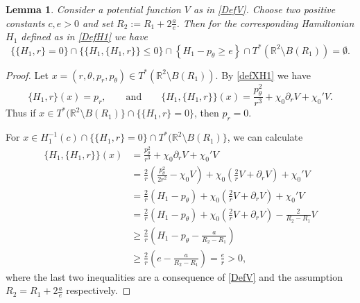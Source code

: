 \documentclass[a4paper]{amsart}
\newtheorem{lem}[thm]{Lemma}%
\numberwithin{equation}{section}
\newcommand{\R}{\mathbb{R}}
\begin{document}
\begin{lem}\label{lem:emptySet}
Consider a potential function $V$ as in \eqref{DefV}. Choose two positive constants $c,e>0$ and set $R_2:=R_1+2\frac{a}{e}$. Then for the corresponding Hamiltonian $H_1$ defined as in \eqref{DefH1} we have
$$
\{\{H_1,r\}=0\}\cap \{\{H_1,\{H_1,r\}\}\leq 0\}\cap \left\lbrace H_1-p_\theta \geq e\right\rbrace\cap T^*(\R^2\setminus B(R_1))=\emptyset.
$$
\end{lem}
\begin{proof}
Let $x=(r,\theta, p_r, p_\theta) \in T^*(\R^2\setminus B(R_1))$. By \eqref{defXH1} we have
$$
\{H_1,r\}(x) = p_r, \qquad \textrm{and}\qquad \{H_1, \{H_1, r\}\}(x)=\frac{p_\theta^2}{r^3}+\chi_0\partial_rV+\chi_0' V.
$$
Thus if $x \in T^*(\R^2\setminus B(R_1)\}\cap \{\{H_1,r\}=0\}$, then $p_r=0$. 

For $x\in H_1^{-1}(c)\cap\{\{H_1,r\}=0\}\cap T^*(\R^2\setminus B(R_1)\}$, we can calculate
\begin{align}
\{H_1, \{H_1, r\}\}(x) & =\frac{p_\theta^2}{r^3}+\chi_0\partial_rV+\chi_0' V\nonumber \\
& = \frac{2}{r}\left( \frac{p_\theta^2}{2r^2}-\chi_0 V\right)+\chi_0\left( \frac{2}{r}V+ \partial_rV\right)+\chi_0' V\nonumber\\
& = \frac{2}{r}(H_1-p_\theta)+\chi_0\left( \frac{2}{r}V+ \partial_rV\right)+\chi_0' V\nonumber\\
& = \frac{2}{r}(H_1-p_\theta)+\chi_0\left( \frac{2}{r}V+ \partial_rV\right)-\frac{2}{R_2-R_1} V\nonumber\\
& \geq  \frac{2}{r}\left( H_1-p_\theta-\frac{a}{R_2-R_1}\right)\label{H1H1r}\\
& \geq \frac{2}{r}\left( e-\frac{a}{R_2-R_1}\right)=\frac{e}{r}>0,\nonumber
\end{align}
where the last two inequalities are a consequence of \eqref{DefV} and the assumption $R_2=R_1+2\frac{a}{e}$ respectively.

\end{proof}
\end{document}
